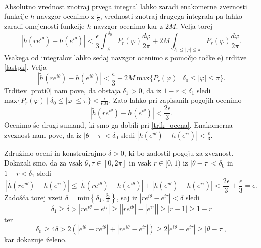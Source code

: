 \documentclass[mat1, tisk]{fmfdelo}
\begin{document}
\begin{dokaz}
\begin{align*}
        \end{align*}
        Absolutno vrednost znotraj prvega integral lahko zaradi enakomerne zveznosti funkcije $h$ navzgor ocenimo z $\frac{\epsilon}{3}$, vrednosti znotraj drugega integrala pa lahko zaradi omejenosti funkcije $h$ navzgor ocenimo kar z $2M$. Velja torej
        $$
        \left|\widetilde{h}(re^{i\theta}) - h(e^{i\theta})\right| < \frac{\epsilon}{3} \int_{-\delta_0}^{\delta_0}{P_r(\varphi) \frac{d\varphi}{2\pi}} + 2M\int_{\delta_0 \leq |\varphi| \leq \pi}{P_r(\varphi)\frac{d\varphi}{2\pi}}.
        $$
        Vsakega od integralov lahko sedaj navzgor ocenimo s pomočjo točke e) trditve \ref{lastpk}. Velja
        $$
        \left|\widetilde{h}(re^{i\theta}) - h(e^{i\theta})\right| < \frac{\epsilon}{3}  + 2M~\text{max}\{P_r(\varphi)~| ~\delta_0 \leq |\varphi| \leq \pi \}.
        $$
        Trditev \ref{proti0} nam pove, da obstaja $\delta_1 >0$, da iz $1 - r < \delta_1$ sledi $\text{max}\{P_r(\varphi)~| ~\delta_0 \leq |\varphi| \leq \pi \} < \frac{\epsilon}{6M}$.
        Zato lahko pri zapisanih pogojih ocenimo
        $$
        \left|\widetilde{h}(re^{i\theta}) - h(e^{i\theta})\right| < \frac{2 \epsilon}{3}.
        $$
        Ocenimo še drugi sumand, ki smo ga dobili pri \eqref{trik_ocena}. Enakomerna zveznost nam pove, da iz $|\theta - \tau| < \delta_0$ sledi $|h\left(e^{i\theta}\right) - h\left(e^{i\tau}\right)| < \frac{\epsilon}{3}$.
        
        Združimo oceni in konstruirajmo $\delta>0$, ki bo zadostil pogoju za zveznost. Dokazali smo, da za vsak $\theta, \tau \in [0,2\pi]$ in vsak $r \in [0,1)$ iz $|\theta - \tau| < \delta_0$ in $1- r < \delta_1$ sledi
        $$
        \left|\widetilde{h}(r e^{i \theta}) - h(e^{i\tau})\right| \leq \left|\widetilde{h}(re^{i\theta}) - h(e^{i\theta})\right| + \left|h\left(e^{i\theta}\right) - h\left(e^{i\tau}\right)\right| < \frac{2 \epsilon}{3} + \frac{\epsilon}{3} = \epsilon.
        $$
        Zadošča torej vzeti $\delta = \text{min}\left\{\delta_1, \frac{\delta_0}{4}\right\}$, saj iz $|r e^{i \theta} - e^{i\tau}| < \delta$ sledi
        $$ 
            \delta_1 \geq \delta > |r e^{i \theta} - e^{i\tau}| \geq \left||r e^{i \theta}| - |e^{i\tau}|\right| \geq |r - 1| \geq 1 -r
        $$
        ter
        $$ 
            \delta_0 \geq 4 \delta > 2 \left(\left| e^{i \theta} - r e^{i\theta} \right| +  \left|r e^{i\theta} - e^{i\tau} \right| \right) \geq 2 \left|e^{i\theta} - e^{i\tau} \right| \geq |\theta - \tau|,
        $$
        kar dokazuje želeno.
    \end{dokaz}
\end{document}
